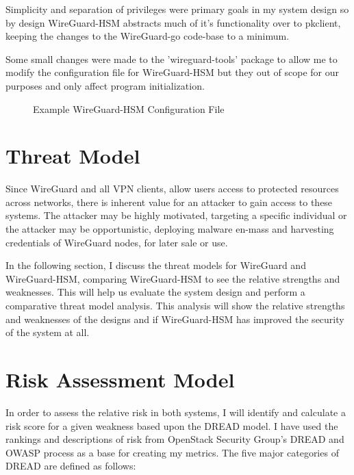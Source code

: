 \documentclass [11pt, proquest] {uwthesis}[2020/02/24]
\begin{document}
Simplicity and separation of privileges were primary goals in my system design so by design WireGuard-HSM abstracts much of it's functionality over to pkclient, keeping the changes to the WireGuard-go code-base to a minimum. 

Some small changes were made to the 'wireguard-tools' package to allow me to modify the configuration file for WireGuard-HSM but they out of scope for our purposes and only affect program initialization.

\begin{figure}[ht]
\begin{center}
\caption{Example WireGuard-HSM Configuration File}
\label{fig:wg_hsm_config}
\end{center}
\end{figure}

\section{Threat Model}
Since WireGuard and all VPN clients, allow users access to protected resources across networks, there is inherent value for an attacker to gain access to these systems.
The attacker may be highly motivated, targeting a specific individual or the attacker may be opportunistic, deploying malware en-mass and harvesting credentials of WireGuard nodes, for later sale or use.


In the following section, I discuss the threat models for WireGuard and WireGuard-HSM, comparing WireGuard-HSM to see the relative strengths and weaknesses. This will help us evaluate the system design and perform a comparative threat model analysis. This analysis will show the relative strengths and weaknesses of the designs and if WireGuard-HSM has improved the security of the system at all.

\section{Risk Assessment Model}
In order to assess the relative risk in both systems, I will identify and calculate a risk score for a given weakness based upon the DREAD model. I have used the rankings and descriptions of risk from OpenStack Security Group's DREAD and OWASP process \cite{noauthor_securityossa-metrics_2022}\cite{noauthor_threat_2022} as a base for creating my metrics. The five major categories of DREAD are defined as follows:
\end{document}
